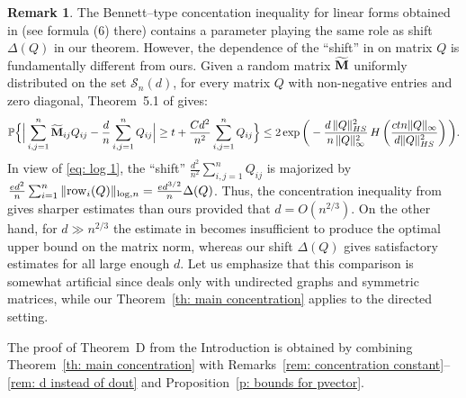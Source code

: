 \documentclass[12pt]{article}
\theoremstyle{definition}
\newtheorem{Remark}[theorem]{Remark}
\theoremstyle{plain}
\def\ranmtx{{\bf{}M}}
\def\Prob{{\mathbb P}}
\def\SymMatrixSet{{\mathcal S}_n}
\def\Row{{\rm row}}
\begin{document}
\begin{Remark}
The Bennett--type concentation inequality for linear forms obtained in \cite{CGJ} (see formula (6) there)
contains a parameter playing the same role as shift $\Delta(Q)$ in our theorem.
However, the dependence of the ``shift'' in \cite{CGJ} on matrix $Q$ is fundamentally different from ours.
Given a random matrix $\widetilde\ranmtx$ uniformly distributed on the set $\SymMatrixSet(d)$,
for every matrix $Q$ with non-negative entries and zero diagonal, Theorem~5.1 of \cite{CGJ} gives:
$$\Prob\Big\{\Big|\sum_{i,j=1}^n \widetilde\ranmtx_{ij}Q_{ij}-\frac{d}{n}\sum_{i,j=1}^n Q_{ij}\Big|\geq t+\frac{Cd^2}{n^2}
\sum_{i,j=1}^n Q_{ij}\Big\}\leq 2\exp\bigg(-\frac{d\,\|Q\|_{HS}^2}{n\,\|Q\|_\infty^2}
\, H\left(\frac{ctn\|Q\|_\infty}{d\|Q\|_{HS}^2}\right)\bigg).$$
In view of \eqref{eq: log 1},
the ``shift'' $\frac{d^2}{n^2}\sum_{i,j=1}^n Q_{ij}$ is majorized by
$\frac{ed^2}{n}\sum_{i=1}^n \|\Row_i(Q)\|_{\log,n}=\frac{ed^{3/2}}{n}\Delta(Q)$.
Thus, the concentration inequality from \cite{CGJ} gives sharper estimates than ours provided that $d=O(n^{2/3})$.
On the other hand, for $d\gg n^{2/3}$ the estimate in \cite{CGJ} becomes insufficient to produce
the optimal upper bound on the matrix norm, whereas our shift $\Delta(Q)$ gives satisfactory estimates
for all large enough $d$. Let us emphasize that this comparison is somewhat artificial
since \cite{CGJ} deals only with undirected graphs and symmetric matrices, while our Theorem~\ref{th: main concentration}
applies to the directed setting.
\end{Remark}

The proof of Theorem~D from the Introduction is obtained by combining Theorem~\ref{th: main concentration}
with Remarks~\ref{rem: concentration constant}--\ref{rem: d instead of dout} and Proposition~\ref{p: bounds for pvector}.

\bigskip
\end{document}
